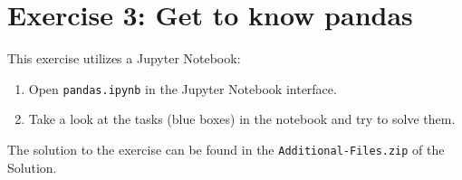 \documentclass[
english,
smallborders
]{i6prcsht}
\begin{document}
\section*{Exercise 3: Get to know pandas}

This exercise utilizes a Jupyter Notebook:

\begin{enumerate}
	\item Open \texttt{pandas.ipynb} in the Jupyter Notebook interface.
	\item Take a look at the tasks (blue boxes) in the notebook and try to solve them.
\end{enumerate}

\begin{solution}
	The solution to the exercise can be found in the \texttt{Additional-Files.zip} of the Solution.
\end{solution}
\end{document}

